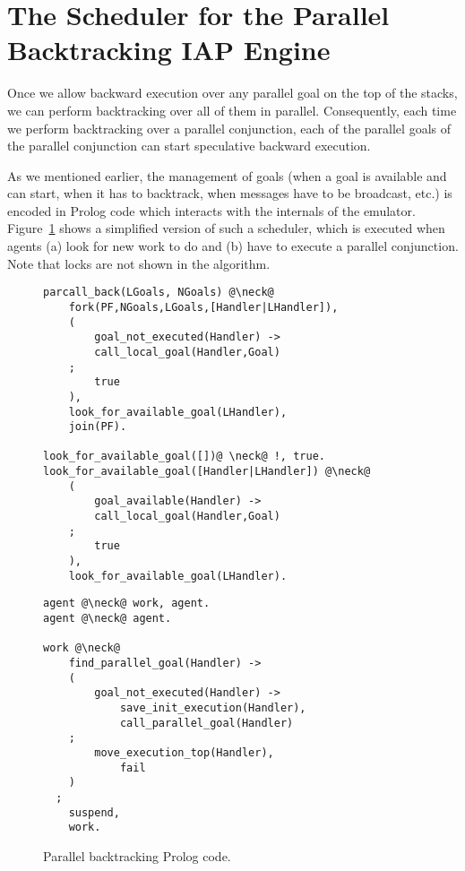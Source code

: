 \documentclass{tlp}
\newcounter{mnotei} \setcounter{mnotei}{0}
\newcommand{\mnote}[1]{{\scriptsize\textsf{\textcolor{blue}{$^{[\themnotei]}$}}}\marginpar{\scriptsize\textsf{\textcolor{red}{n.\themnotei: #1}}}\stepcounter{mnotei} }
\renewcommand{\mnote}[1]{}
\newcommand{\compressection}{\vspace{-1em}}
\newcommand{\compressfigure}{\vspace{-1em}}
\begin{document}
\mnote{MCL: we show speedups, but not how often goals are trapped.
  Can we get numbers for that? There would be trapped goals only in
  qsort\_nd for seqback, not for parback. This benchmarks is not
  actually working under seqback.}














\compressection
\section{The Scheduler for the Parallel Backtracking IAP Engine}
\label{sec:prolog-scheduler}
 
Once we allow backward execution over any parallel goal on the top of
the stacks, we can perform backtracking over all of them in
parallel. Consequently, each time we perform backtracking over a
parallel conjunction, each of the parallel goals of the parallel
conjunction can start speculative backward execution.

As we mentioned earlier, the management of goals (when a goal is
available and can start, when it has to backtrack, when messages have
to be broadcast, etc.) is encoded in Prolog code which
interacts with the internals of the emulator.
Figure~\ref{fig:scheduler} shows a simplified version of such a
scheduler, which is executed when agents (a) look for new work to do
and (b) have to execute a parallel conjunction. Note that
locks are not shown in the algorithm.

\begin{figure}[t]
  \centering
  \begin{minipage}[b]{0.49\linewidth}
    \begin{lstlisting}
parcall_back(LGoals, NGoals) @\neck@
    fork(PF,NGoals,LGoals,[Handler|LHandler]),
    (
        goal_not_executed(Handler) ->
        call_local_goal(Handler,Goal)
    ;   
        true
    ),
    look_for_available_goal(LHandler),
    join(PF).

look_for_available_goal([])@ \neck@ !, true.
look_for_available_goal([Handler|LHandler]) @\neck@ 
    (
        goal_available(Handler) ->
        call_local_goal(Handler,Goal)
    ;   
        true
    ),
    look_for_available_goal(LHandler).
    \end{lstlisting}
  \end{minipage}
\hfill
  \begin{minipage}[b]{0.4\linewidth}
    \begin{lstlisting}
agent @\neck@ work, agent.
agent @\neck@ agent.

work @\neck@
    find_parallel_goal(Handler) ->
    ( 
        goal_not_executed(Handler) ->
            save_init_execution(Handler),
            call_parallel_goal(Handler)
	;
	    move_execution_top(Handler),
            fail
    )
  ;
    suspend, 
    work.
    \end{lstlisting}
  \end{minipage}
  \caption{Parallel backtracking Prolog code.} 
  \label{fig:scheduler}
\compressfigure
\end{figure}
\end{document}
